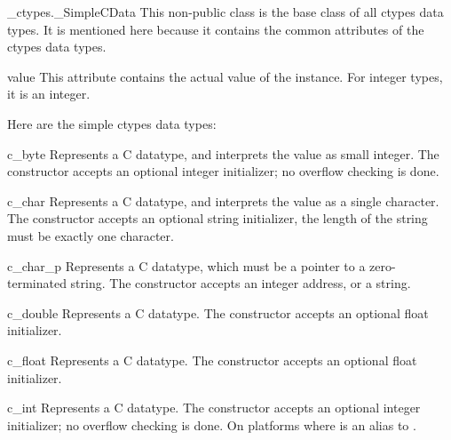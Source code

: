 \begin{classdesc}{_ctypes._SimpleCData}{}
This non-public class is the base class of all ctypes data types.  It
is mentioned here because it contains the common attributes of the
ctypes data types.
\end{classdesc}

\begin{memberdesc}{value}
This attribute contains the actual value of the instance.  For integer
types, it is an integer.
\end{memberdesc}

Here are the simple ctypes data types:

\begin{classdesc}{c_byte}{}
Represents a C  datatype, and interprets the value
as small integer.  The constructor accepts an optional integer
initializer; no overflow checking is done.
\end{classdesc}

\begin{classdesc}{c_char}{}
Represents a C  datatype, and interprets the value as a
single character.  The constructor accepts an optional string
initializer, the length of the string must be exactly one character.
\end{classdesc}

\begin{classdesc}{c_char_p}{}
Represents a C  datatype, which must be a pointer to a
zero-terminated string.  The constructor accepts an integer address,
or a string.
\end{classdesc}

\begin{classdesc}{c_double}{}
Represents a C  datatype.  The constructor accepts an
optional float initializer.
\end{classdesc}

\begin{classdesc}{c_float}{}
Represents a C  datatype.  The constructor accepts an
optional float initializer.
\end{classdesc}

\begin{classdesc}{c_int}{}
Represents a C  datatype.  The constructor accepts an
optional integer initializer; no overflow checking is done.  On
platforms where   is an
alias to .
\end{classdesc}

